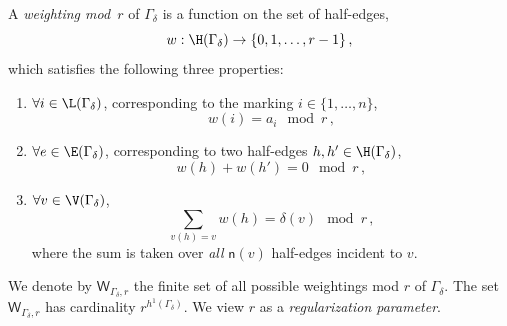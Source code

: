 \begin{definition}
\notready A {\em weighting mod~$r$} of $\Gamma_\delta$ is a function on the set of half-edges,
$$ w:\H(\Gamma_\delta) \rightarrow \{0,1, \ldots, r-1\}\, ,$$
which satisfies the following three properties:

\begin{enumerate}
\item[(i)] $\forall i\in \L(\Gamma_\delta)$, corresponding to
 the marking $i\in \{1,\ldots, n\}$,
$$w(i)=a_i  \mod r\, ,$$
\item[(ii)] $\forall e \in \E(\Gamma_\delta)$, corresponding to two half-edges
$h,h' \in \H(\Gamma_\delta)$,
$$w(h)+w(h')=0 \mod r\, ,$$
\item[(iii)] $\forall v\in \V(\Gamma_\delta)$,
$$\sum_{v(h)= v} w(h)= \delta(v) \mod r\, ,$$
where the sum is taken over {\em all} $\mathsf{n}(v)$ half-edges incident
to $v$.\end{enumerate}
\end{definition}



We denote by $\mathsf{W}_{\Gamma_\delta,r}$ the finite set of all possible weightings
mod $r$
of
$\Gamma_\delta$. The set $\mathsf{W}_{\Gamma_\delta,r}$ has cardinality $r^{h^1(\Gamma_\delta)}$.
We view $r$ as a {\em regularization parameter}.

